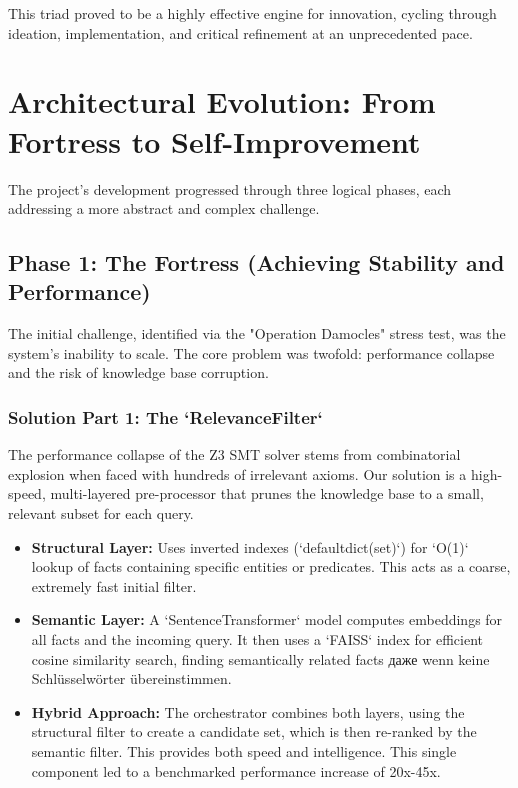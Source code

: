 \documentclass[11pt, a4paper]{article}
\begin{document}
This triad proved to be a highly effective engine for innovation, cycling through ideation, implementation, and critical refinement at an unprecedented pace.

\section{Architectural Evolution: From Fortress to Self-Improvement}
\label{sec:evolution}
The project's development progressed through three logical phases, each addressing a more abstract and complex challenge.

\subsection{Phase 1: The Fortress (Achieving Stability and Performance)}
\label{subsec:fortress}
The initial challenge, identified via the "Operation Damocles" stress test, was the system's inability to scale. The core problem was twofold: performance collapse and the risk of knowledge base corruption.

\subsubsection{Solution Part 1: The `RelevanceFilter`}
The performance collapse of the Z3 SMT solver stems from combinatorial explosion when faced with hundreds of irrelevant axioms. Our solution is a high-speed, multi-layered pre-processor that prunes the knowledge base to a small, relevant subset for each query.

\begin{itemize}
    \item \textbf{Structural Layer:} Uses inverted indexes (`defaultdict(set)`) for `O(1)` lookup of facts containing specific entities or predicates. This acts as a coarse, extremely fast initial filter.
    \item \textbf{Semantic Layer:} A `SentenceTransformer` model computes embeddings for all facts and the incoming query. It then uses a `FAISS` index for efficient cosine similarity search, finding semantically related facts даже wenn keine Schlüsselwörter übereinstimmen.
    \item \textbf{Hybrid Approach:} The orchestrator combines both layers, using the structural filter to create a candidate set, which is then re-ranked by the semantic filter. This provides both speed and intelligence. This single component led to a benchmarked performance increase of 20x-45x.
\end{itemize}
\end{document}
